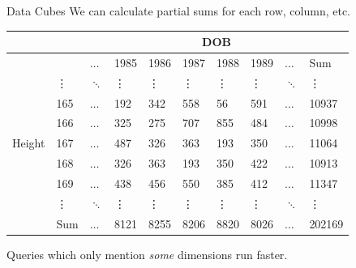 \documentclass{beamer}
\theoremstyle{definition}
\theoremstyle{definition}
\begin{document}
\begin{frame}{Data Cubes}
    We can calculate partial sums for each row, column, etc.\cite{Gray96}
    \begin{table}[h]\footnotesize
        \begin{tabular} { | l | l | l | l | l | l | l | l | l | l |}
        \hline
        & & \multicolumn{8}{|c|}{DOB} \\ \hline
        & & $\hdots$ & 1985 & 1986 & 1987 & 1988 & 1989 & $\hdots$ & Sum \\ \hline
        \multirow{7}{*}{Height}
        & \vdots & $\ddots$ & \vdots & \vdots & \vdots & \vdots & \vdots & $\ddots$ & \vdots \\
        & 165 & $\hdots$ & 192 & 342 & 558 & 56 & 591 & $\hdots$ & 10937 \\
        & 166 & $\hdots$ & 325 & 275 & 707 & 855 & 484 & $\hdots$ & 10998 \\
        & 167 & $\hdots$ & 487 & 326 & 363 & 193 & 350 & $\hdots$ & 11064 \\
        & 168 & $\hdots$ & 326 & 363 & 193 & 350 & 422 & $\hdots$ & 10913 \\
        & 169 & $\hdots$ & 438 & 456 & 550 & 385 & 412 & $\hdots$ & 11347 \\
        & \vdots & $\ddots$ & \vdots & \vdots & \vdots & \vdots & \vdots & $\ddots$ & \vdots \\
        & Sum & $\hdots$ & 8121 & 8255 & 8206 & 8820 & 8026 & $\hdots$ & 202169 \\
        \hline
        \end{tabular}
    \end{table}

    Queries which only mention \textit{some} dimensions run faster.
\end{frame}
\end{document}
